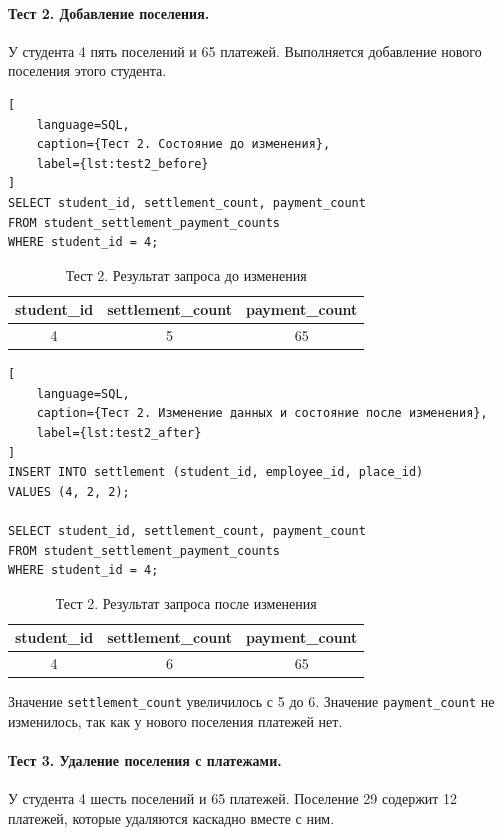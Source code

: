 \paragraph{Тест 2. Добавление поселения.}
У студента 4 пять поселений и 65 платежей. Выполняется добавление нового поселения этого студента.

\begin{lstlisting}[
    language=SQL,
    caption={Тест 2. Состояние до изменения},
    label={lst:test2_before}
]
SELECT student_id, settlement_count, payment_count
FROM student_settlement_payment_counts
WHERE student_id = 4;
\end{lstlisting}

\begin{table}[H]
\centering
\caption{Тест 2. Результат запроса до изменения}
\label{tab:test2_before}
\small
\begin{tabular}{|c|c|c|}
\hline
\textbf{student\_id} & \textbf{settlement\_count} & \textbf{payment\_count} \\ \hline
4 & 5 & 65 \\ \hline
\end{tabular}
\end{table}

\begin{lstlisting}[
    language=SQL,
    caption={Тест 2. Изменение данных и состояние после изменения},
    label={lst:test2_after}
]
INSERT INTO settlement (student_id, employee_id, place_id)
VALUES (4, 2, 2);

SELECT student_id, settlement_count, payment_count
FROM student_settlement_payment_counts
WHERE student_id = 4;
\end{lstlisting}

\begin{table}[H]
\centering
\caption{Тест 2. Результат запроса после изменения}
\label{tab:test2_after}
\small
\begin{tabular}{|c|c|c|}
\hline
\textbf{student\_id} & \textbf{settlement\_count} & \textbf{payment\_count} \\ \hline
4 & 6 & 65 \\ \hline
\end{tabular}
\end{table}

Значение \texttt{settlement\_count} увеличилось с 5 до 6. Значение \texttt{payment\_count} не изменилось, так как у нового поселения платежей нет.

\paragraph{Тест 3. Удаление поселения с платежами.}
У студента 4 шесть поселений и 65 платежей. Поселение 29 содержит 12 платежей, которые удаляются каскадно вместе с ним.


